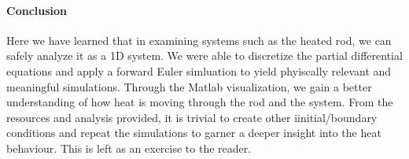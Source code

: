  \paragraph{Conclusion}
Here we have learned that in examining systems such as the heated rod, we can safely analyze it as a 1D system. We were able to discretize the partial differential equations and 
apply a forward Euler simluation to yield phyiscally relevant and meaningful simulations. Through the Matlab visualization, we gain a better understanding of how heat is moving 
through the rod and the system. From the resources and analysis provided, it is trivial to create other iinitial/boundary conditions and repeat the simulations to garner a deeper
insight into the heat behaviour. This is left as an exercise to the reader. 
 
